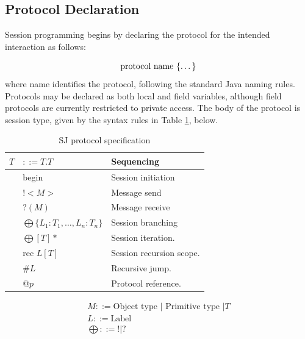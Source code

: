 \subsection{Protocol Declaration}

Session programming begins by declaring the protocol for the intended interaction as follows:

\begin{equation*}
\text{protocol name \{\dots\}}
\end{equation*}
where name identifies the protocol, following the standard Java naming rules. Protocols may be declared as both local and field variables, although field protocols are currently restricted to private access. The body of the protocol is session type, given by the syntax rules in Table \ref{tab:sj-spec}, below.


\begin{longtable}{|p{}|p{}|p{}|}
\caption{SJ protocol specification}\label{tab:sj-spec} \\
\hline
$T$ & $::=T.T$ & Sequencing \\ \hline
& begin & Session initiation \\ \hline
& $!<M>$ & Message send \\ \hline 
& $?(M)$ & Message receive \\ \hline
& $\bigoplus \{L_1:T_1,\dots, L_n:T_n \}$ & Session branching \\ \hline
& $\bigoplus [T]*$ & Session iteration. \\ \hline 
& $\text{rec }L[T]$ & Session recursion scope. \\ \hline
& \#$L$ & Recursive jump. \\ \hline
& @$p$ & Protocol reference. \\ \hline
\end{longtable}

\begin{equation*}
\begin{array}{c}
M ::= \text{Object type } | \text{ Primitive type } | T \\
L ::= \text{Label} \\
\bigoplus ::= ! | ?
\end{array}
\end{equation*}

